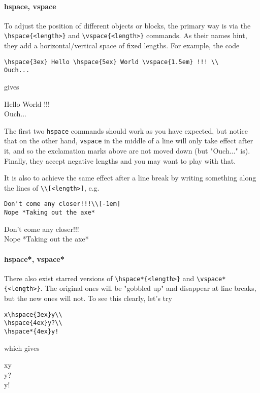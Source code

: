 \paragraph{hspace, vspace}
To adjust the position of different objects or blocks, the primary way is via the \texttt{\textbackslash hspace\{<length>\}} and \texttt{\textbackslash vspace\{<length>\}} commands. As their names hint, they add a horizontal/vertical space of fixed lengths. For example, the code
\begin{lstlisting}
\hspace{3ex} Hello \hspace{5ex} World \vspace{1.5em} !!! \\
Ouch...
\end{lstlisting}
gives \par
\hspace{3ex} Hello \hspace{5ex} World \vspace{1.5em} !!! \\
Ouch...\par
The first two \texttt{\text hspace} commands should work as you have expected, but notice that on the other hand, \texttt{\text vspace} in the middle of a line will only take effect after it, and so the exclamation marks above are not moved down (but "Ouch..." is). Finally, they accept negative lengths and you may want to play with that.\par

It is also to achieve the same effect after a line break by writing something along the lines of \texttt{\textbackslash\textbackslash [<length>]}, e.g.
\begin{lstlisting}
Don't come any closer!!!\\[-1em]
Nope *Taking out the axe*
\end{lstlisting}
Don't come any closer!!!\\[-1em]
Nope *Taking out the axe*

\paragraph{hspace*, vspace*}
There also exist starred versions of \texttt{\textbackslash hspace*\{<length>\}} and \texttt{\textbackslash vspace*\{<length>\}}. The original ones will be "gobbled up" and disappear at line breaks, but the new ones will not. To see this clearly, let's try
\begin{lstlisting}
x\hspace{3ex}y\\
\hspace{4ex}y?\\
\hspace*{4ex}y!
\end{lstlisting}
which gives \par
x\hspace{3ex}y\\
\hspace{4ex}y?\\
\hspace*{4ex}y!

